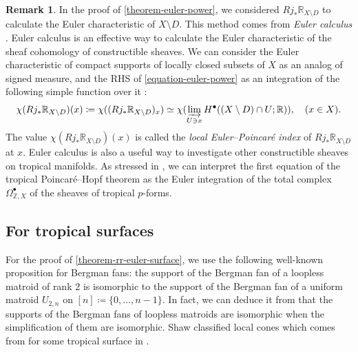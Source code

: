 \documentclass[a4paper,dvipdfmx,reqno,12pt]{amsart}
\theoremstyle{definition}
\newtheorem{remark}[theorem]{Remark}
\newcommand{\deq}{\coloneqq}
\numberwithin{equation}{section}
\begin{document}
\begin{remark}
In the proof of \cref{theorem-euler-power},
we considered $Rj_*\mathbb{R}_{X\setminus D}$ to calculate
the Euler characteristic of $X\setminus D$.
This method comes from \emph{Euler calculus}
\cite{MR970076,MR1115569}.
Euler calculus is an effective way to calculate
the Euler characteristic of the sheaf cohomology of
constructible sheaves. We can consider 
the Euler characteristic of compact supports of 
locally closed subsets of $X$
as an analog of signed measure,
and the RHS of \cref{equation-euler-power} as an
integration of the following simple function over it
\cite[(3.4)]{MR1115569}:
\begin{align}
\chi(Rj_*\mathbb{R}_{X\setminus D})(x)\deq 
\chi((Rj_*\mathbb{R}_{X\setminus D})_x) 
\simeq \chi(\varinjlim_{U\ni x} H^{\bullet}((X\setminus D)
\cap U;\mathbb{R})), \quad (x\in X).
\end{align}
The value $\chi(Rj_*\mathbb{R}_{X\setminus D})(x)$ is
called the \emph{local Euler--Poincar\'e index} of 
$Rj_*\mathbb{R}_{X\setminus D}$ at $x$.
Euler calculus is also a useful way to
investigate other constructible sheaves
on tropical manifolds.
As stressed in \cite[Remark 4.8]{MR4540954},
we can interpret the first equation of 
the tropical Poincar\'e--Hopf theorem
\cite[Theorem 4.7]{MR4540954} as 
the Euler integration of the total complex
$\Omega^{\bullet}_{\mathbb{Z},X}$ of the sheaves of
tropical $p$-forms.
\end{remark}

\subsection{For tropical surfaces}

For the proof of \cref{theorem-rr-euler-surface}, we 
use the following well-known 
proposition for Bergman fans: 
the support of the Bergman fan of
a loopless matroid of rank $2$ 
is isomorphic to the support of the Bergman fan of
a uniform matroid $U_{2,n}$ on
$[n]\deq \{0,\ldots,n-1\}$.
In fact, we can deduce it from that 
the supports of the Bergman fans of
loopless matroids are isomorphic
when the simplification of them are isomorphic.
Shaw classified local cones which comes from
for some tropical surface in
\cite[Corollary 2.4]{shaw2015tropical}.
\end{document}
